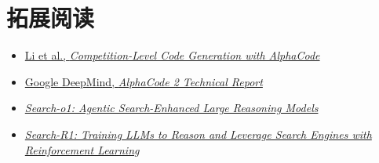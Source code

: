 \section{拓展阅读}

\begin{itemize}
    \item \href{https://arxiv.org/abs/2203.07814}{Li et al., \emph{Competition-Level Code Generation with AlphaCode}}
    \item \href{https://storage.googleapis.com/deepmind-media/AlphaCode2/AlphaCode2_Tech_Report.pdf}{Google DeepMind, \emph{AlphaCode 2 Technical Report}}
    \item \href{https://arxiv.org/search/?query=Search-o1%3A+Agentic+Search-Enhanced+Large+Reasoning+Models\&searchtype=all}{\emph{Search-o1: Agentic Search-Enhanced Large Reasoning Models}}
    \item \href{https://arxiv.org/search/?query=Search-R1\&searchtype=all}{\emph{Search-R1: Training LLMs to Reason and Leverage Search Engines with Reinforcement Learning}}
\end{itemize}

